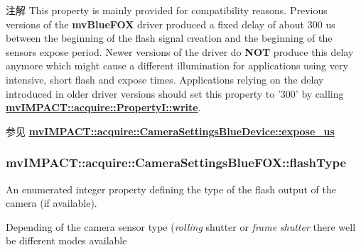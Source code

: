 \begin{DoxyNote}{注解}
This property is mainly provided for compatibility reasons. Previous versions of the {\bfseries mv\+Blue\+F\+O\+X} driver produced a fixed delay of about 300 us between the beginning of the flash signal creation and the beginning of the sensors expose period. Newer versions of the driver do {\bfseries N\+O\+T} produce this delay anymore which might cause a different illumination for applications using very intensive, short flash and expose times. Applications relying on the delay introduced in older driver versions should set this property to '300' by calling {\bfseries \hyperlink{classmv_i_m_p_a_c_t_1_1acquire_1_1_enum_property_i_a5f8110041cdd79bc953d9933737f5812}{mv\+I\+M\+P\+A\+C\+T\+::acquire\+::\+Property\+I\+::write}}.
\end{DoxyNote}
\begin{DoxySeeAlso}{参见}
{\bfseries \hyperlink{classmv_i_m_p_a_c_t_1_1acquire_1_1_camera_settings_blue_device_ab802a564f56c021c4730899f1d8c1cba}{mv\+I\+M\+P\+A\+C\+T\+::acquire\+::\+Camera\+Settings\+Blue\+Device\+::expose\+\_\+us}} 
\end{DoxySeeAlso}
\hypertarget{classmv_i_m_p_a_c_t_1_1acquire_1_1_camera_settings_blue_f_o_x_a9a55515a629ceb7d7b0223711a370dd4}{
\subsubsection[{flash\+Type}]{ mv\+I\+M\+P\+A\+C\+T\+::acquire\+::\+Camera\+Settings\+Blue\+F\+O\+X\+::flash\+Type}}\label{classmv_i_m_p_a_c_t_1_1acquire_1_1_camera_settings_blue_f_o_x_a9a55515a629ceb7d7b0223711a370dd4}


An enumerated integer property defining the type of the flash output of the camera (if available). 

Depending of the camera sensor type ({\itshape rolling} shutter or {\itshape frame} {\itshape shutter} there well be different modes available

